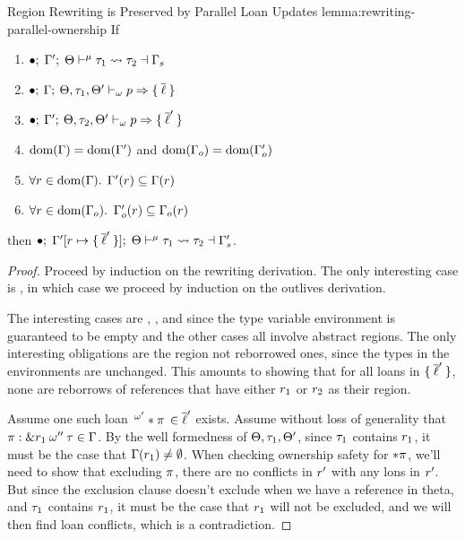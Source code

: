 \begin{oxlemma}{Region Rewriting is Preserved by Parallel Loan Updates}
  {lemma:rewriting-parallel-ownership}
  If
  \begin{enumerate}
  \item $\oxtunify{\oxemptyctx}{\oxkontctx}{\oxvarctx^\prime}{\oxtype_1}{\oxtype_2}{\oxvarctx_s}$
  \item $\oxmusafety{\oxemptyctx}{\oxkontctx, \oxtype_1, \oxkontctx^\prime}{\oxvarctx}{\oxmuta}{\oxplaceexpr}{\oxset{\oxloans}}$
  \item $\oxmusafety{\oxemptyctx}{\oxkontctx, \oxtype_2, \oxkontctx^\prime}{\oxvarctx^\prime}{\oxmuta}{\oxplaceexpr}{\oxset{\oxloans^\prime}}$
  \item $\oxdomain{\oxvarctx} = \oxdomain{\oxvarctx^\prime}$ and $\oxdomain{\oxvarctx_o} = \oxdomain{\oxvarctx_o^\prime}$
  \item $\forall \oxcprov \in \oxdomain{\oxvarctx}.$ $\oxvarctx^\prime(\oxcprov) \subseteq \oxvarctx(\oxcprov)$
  \item $\forall \oxcprov \in \oxdomain{\oxvarctx_o}.$ $\oxvarctx^\prime_o(\oxcprov) \subseteq \oxvarctx_o(\oxcprov)$
  \end{enumerate}
  then
  $\oxtunify{\oxemptyctx}{\oxkontctx}{\oxvarctx^\prime[\oxcprov \mapsto \oxset{\oxloans^\prime}]}{\oxtype_1}{\oxtype_2}{\oxvarctx_s^\prime}$.
\end{oxlemma}

\begin{proof}
  Proceed by induction on the rewriting derivation. The only interesting case is
  , in which case we proceed by induction on the outlives
  derivation.

  The interesting cases are ,
  , and  since
  the type variable environment is guaranteed to be empty and the other cases
  all involve abstract regions. The only interesting obligations are the region
  not reborrowed ones, since the types in the environments are unchanged. This
  amounts to showing that for all loans in $\oxset{\oxloans^\prime}$, none are
  reborrows of references that have either $\oxcprov_1$ or $\oxcprov_2$ as their
  region.

  Assume one such loan $\oxloanpkg{\oxmuta^\prime}{\oxderef \oxplace} \in
  \oxloans^\prime$ exists. Assume without loss of generality that $\oxplace:
  \oxtref{\oxcprov_1}{\oxmuta^{\prime\prime}}{\oxtype} \in \oxvarctx$. By the
  well formedness of $\oxkontctx, \oxtype_1, \oxkontctx^\prime$, since
  $\oxtype_1$ contains $\oxcprov_1$, it must be the case that
  $\oxvarctx(\oxcprov_1) \not = \emptyset$. When checking ownership safety for
  $\oxderef \oxplace$, we'll need to show that excluding $\oxplace$, there are
  no conflicts in $\oxcprov^\prime$ with any lons in $\oxcprov^\prime$. But
  since the exclusion clause doesn't exclude when we have a reference in theta,
  and $\oxtype_1$ contains $\oxcprov_1$, it must be the case that $\oxcprov_1$
  will not be excluded, and we will then find loan conflicts, which is a
  contradiction.
\end{proof}

